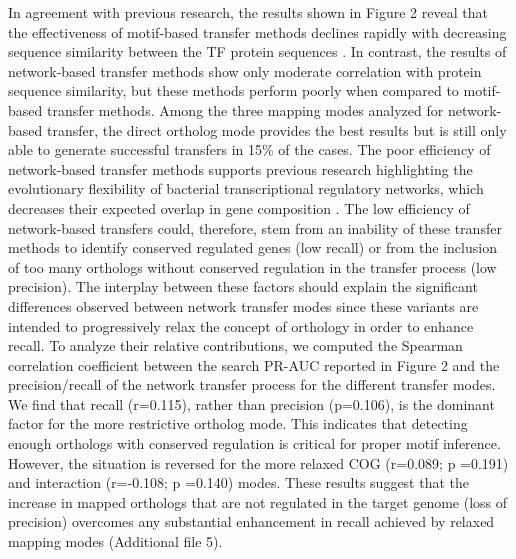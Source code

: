 In agreement with previous research, the results shown in Figure 2 reveal that
the effectiveness of motif-based transfer methods declines rapidly with
decreasing sequence similarity between the TF protein sequences
\cite{yu2004annotation}. In contrast, the results of network-based transfer
methods show only moderate correlation with protein sequence similarity, but
these methods perform poorly when compared to motif-based transfer
methods. Among the three mapping modes analyzed for network-based transfer, the
direct ortholog mode provides the best results but is still only able to
generate successful transfers in 15\% of the cases. The poor efficiency of
network-based transfer methods supports previous research highlighting the
evolutionary flexibility of bacterial transcriptional regulatory networks,
which decreases their expected overlap in gene composition
\cite{venancio2009reconstructing, babu2006evolutionary, chavez2006bacterial,
  price2007orthologous}. The low efficiency of network-based transfers could,
therefore, stem from an inability of these transfer methods to identify
conserved regulated genes (low recall) or from the inclusion of too many
orthologs without conserved regulation in the transfer process (low
precision). The interplay between these factors should explain the significant
differences observed between network transfer modes since these variants are
intended to progressively relax the concept of orthology in order to enhance
recall. To analyze their relative contributions, we computed the Spearman
correlation coefficient between the search PR-AUC reported in Figure 2 and the
precision/recall of the network transfer process for the different transfer
modes. We find that recall (r=0.115), rather than precision (p=0.106), is the
dominant factor for the more restrictive ortholog mode. This indicates that
detecting enough orthologs with conserved regulation is critical for proper
motif inference. However, the situation is reversed for the more relaxed COG
(r=0.089; p =0.191) and interaction (r=-0.108; p =0.140) modes. These results
suggest that the increase in mapped orthologs that are not regulated in the
target genome (loss of precision) overcomes any substantial enhancement in
recall achieved by relaxed mapping modes (Additional file 5).

